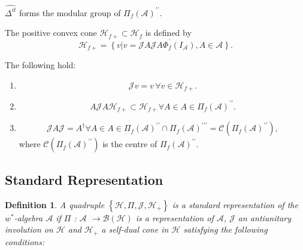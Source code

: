 \documentclass[aps,preprint]{revtex4}%
\newtheorem{definition}[theorem]{Definition}
\begin{document}
$\widehat{\Delta^{it}}$ forms the modular group of $\Pi_{f}\left(
\mathcal{A}\right)  ^{\prime\prime}.$

The positive convex cone $\mathcal{H}_{f+}\subset\mathcal{H}_{f}$ is defined
by
\begin{equation}
\mathcal{H}_{f+}=\overline{\left\{  \left.  v\right\vert v=\mathcal{J}%
A\mathcal{J}A\Phi_{f}\left(  I_{\mathcal{A}}\right)  ,A\in\mathcal{A}\right\}
}.
\end{equation}


The following hold:

\begin{enumerate}
\item
\begin{equation}
\mathcal{J}v=v\,\forall v\in\mathcal{H}_{f+}.
\end{equation}


\item
\begin{equation}
A\mathcal{J}A\mathcal{H}_{f+}\subset\mathcal{H}_{f+}\forall A\in A\in\Pi
_{f}\left(  \mathcal{A}\right)  ^{\prime\prime}.
\end{equation}


\item
\begin{equation}
\mathcal{J}A\mathcal{J}=A^{\dagger}\forall A\in A\in\Pi_{f}\left(
\mathcal{A}\right)  ^{\prime\prime}\cap\Pi_{f}\left(  \mathcal{A}\right)
^{\prime\prime\prime}=\mathcal{C}\left(  \Pi_{f}\left(  \mathcal{A}\right)
^{\prime\prime}\right)  ,
\end{equation}
where $\mathcal{C}\left(  \Pi_{f}\left(  \mathcal{A}\right)  ^{\prime\prime
}\right)  $ is the centre of $\Pi_{f}\left(  \mathcal{A}\right)
^{\prime\prime}.$
\end{enumerate}

\subsection{Standard Representation}

\begin{definition}
A quadruple $\left\{  \mathcal{H},\Pi,\mathcal{J},\mathcal{H}_{+}\right\}  $
is a standard representation of the $w^{\ast}$-algebra $\mathcal{A}$ if $\Pi$
: $\mathcal{A}$ $\rightarrow\mathcal{B}(\mathcal{H})$ is a representation of
$\mathcal{A}$, $\mathcal{J}$ an antiunitary involution on $\mathcal{H}$ and
$\mathcal{H}_{+}$ a self-dual cone in $\mathcal{H}$ satisfying the following conditions:
\end{definition}
\end{document}

